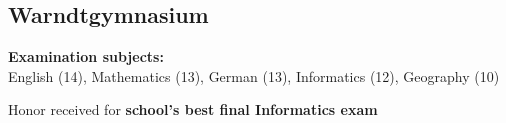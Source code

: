 \documentclass[]{jonas-cv}
\begin{document}
\begin{minipage}[t]{0.33\textwidth}
\subsection{Warndtgymnasium}

\begin{tightemize}
    \item \textbf{Examination subjects:}\\
        English (14), Mathematics (13), German (13), Informatics (12), Geography (10)
    \item Honor received for \textbf{school's best final Informatics exam}
\end{tightemize}
\largesectionsep
\vspace{-0.5mm}






%
%

\end{minipage} 
\hspace{1.5mm}
\vrule %
\hspace{1.5mm}
\end{document}
